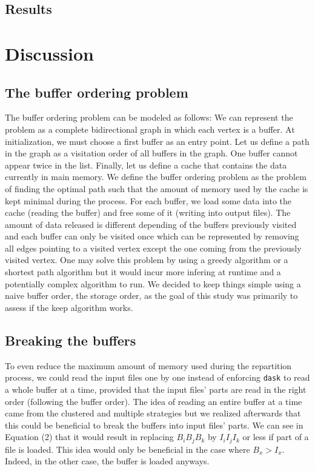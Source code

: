 \documentclass[conference]{IEEEtran}
\begin{document}
\subsection{Results}

\section{Discussion}

\subsection{The buffer ordering problem}
The buffer ordering problem can be modeled as follows: We can represent the
problem as a complete bidirectional graph in which each vertex is a buffer. At
initialization, we must choose a first buffer as an entry point. Let us define
a path in the graph as a visitation order of all buffers in the graph. One buffer
cannot appear twice in the list. Finally, let us define a cache that contains
the data currently in main memory. We define the buffer ordering problem as the
problem of finding the optimal path such that the amount of memory used by the
cache is kept minimal during the process. For each buffer, we load some data
into the cache (reading the buffer) and free some of it (writing into output files).
The amount of
data released is different depending of the buffers previously visited and each
buffer can only be visited once which can be represented by removing all edges
pointing to a visited vertex except the one coming from the previously visited
vertex. One may solve this problem by using a greedy algorithm or a shortest path
algorithm but it would
incur more infering at runtime and a potentially complex algorithm to run.
We decided to keep things simple using a naive buffer order, the storage order,
as the goal of this study was primarily to assess if the keep algorithm works.

\subsection{Breaking the buffers}
To even reduce the maximum amount of memory used during the repartition process, we
could read the input files one by one instead of enforcing \texttt{dask} to read a whole
buffer at a time, provided that the input files' parts are read in the right
order (following the buffer order). The idea of reading an entire buffer at a
time came from the clustered and multiple strategies but we realized afterwards
that this could be beneficial to break the buffers into input files' parts. We
can see in Equation (2) that it would result in replacing $B_iB_jB_k$ by
$I_iI_jI_k$ or less if part of a file is loaded. This idea would only be
beneficial in the case where $B_x>I_x$. Indeed, in the other case, the buffer is
loaded anyways.
\end{document}
